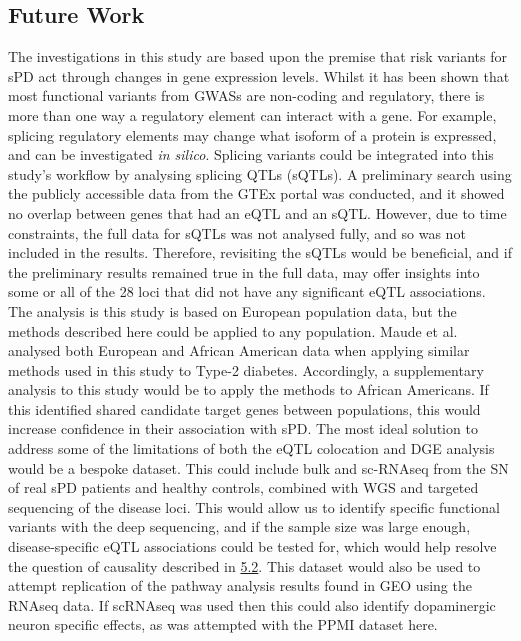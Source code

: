 \documentclass{article}
\begin{document}
\subsection{Future Work}
The investigations in this study are based upon the premise that risk variants for sPD act through changes in gene expression levels. Whilst it has been shown that most functional variants from GWASs are non-coding and regulatory\cite{Maurano2012SystematicDNA}, there is more than one way a regulatory element can interact with a gene. For example, splicing regulatory elements may change what isoform of a protein is expressed, and can be investigated \textit{in silico}\cite{Tubeuf2020LargescaleElements}. Splicing variants could be integrated into this study's workflow by analysing splicing QTLs (sQTLs). A preliminary search using the publicly accessible data from the GTEx portal\cite{Aguet2020TheTissues} was conducted, and it showed no overlap between genes that had an eQTL and an sQTL. However, due to time constraints, the full data for sQTLs was not analysed fully, and so was not included in the results. Therefore, revisiting the sQTLs would be beneficial, and if the preliminary results remained true in the full data, may offer insights into some or all of the 28 loci that did not have any significant eQTL associations.
The analysis is this study is based on European population data, but the methods described here could be applied to any population. Maude et al.\cite{Maude2021NewDiabetes.} analysed both European and African American data when applying similar methods used in this study to Type-2 diabetes. Accordingly, a supplementary analysis to this study would be to apply the methods to African Americans. If this identified shared candidate target genes between populations, this would increase confidence in their association with sPD. 
The most ideal solution to address some of the limitations of both the eQTL colocation and DGE analysis would be a bespoke dataset. This could include bulk and sc-RNAseq from the SN of real sPD patients and healthy controls, combined with WGS and targeted sequencing of the disease loci. This would allow us to identify specific functional variants with the deep sequencing, and if the sample size was large enough, disease-specific eQTL associations could be tested for, which would help resolve the question of causality described in \hyperref[subsubsec:causality]{5.2}. This dataset would also be used to attempt replication of the pathway analysis results found in GEO using the RNAseq data. If scRNAseq was used then this could also identify dopaminergic neuron specific effects, as was attempted with the PPMI dataset here. 
\end{document}
